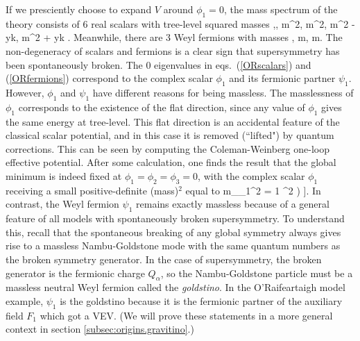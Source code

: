 If we presciently choose to expand $V$ around $\phi_1=0$, the mass
spectrum
of the theory
consists of 6 real scalars with tree-level squared masses
,\>,\>\> m^2,\>\> m^2,\>\> m^2 - yk,\>\> m^2 + yk .
\label{ORscalars}
\eeq
Meanwhile, there are 3 Weyl fermions with masses
,\>\> m,\>\> m.
\label{ORfermions}
\eeq
The non-degeneracy of scalars and fermions is a clear sign that
supersymmetry has been spontaneously broken.
The 0 eigenvalues in eqs.~(\ref{ORscalars}) and (\ref{ORfermions})
correspond to the complex scalar $\phi_1$
and its fermionic partner $\psi_1$.
However, $\phi_1$ and $\psi_1$ have different reasons
for being massless. The masslessness of $\phi_1$ corresponds to the
existence of the flat direction, since any value of
$\phi_1$ gives the same energy at tree-level.
This flat direction is an accidental feature of the classical
scalar potential, and in this case it is removed (``lifted") by quantum
corrections. This can be seen by computing the Coleman-Weinberg
one-loop effective potential.\cite{ColemanWeinberg}
After some calculation, one finds
the result that the global minimum is
indeed fixed at
$\phi_1=\phi_2=\phi_3=0$, with the complex scalar
$\phi_1$ receiving a small positive-definite (mass)$^2$ equal to
\beq
m_{\phi_1}^2 = {1 \pi^2} \left [
\Bigl ({ym^4\over k} + y^3 k \Bigr ) {\rm ln}\Bigl (
{m^2 + yk\over m^2 - yk} \Bigr ) +
2y^2  m^2 \Bigl ( {\rm ln}[1 - {y^2k^2 \over m^4}] -1\Bigr )
\right ].\>\>\>\>\>\>\>{}
\eeq
[In the limit $yk\ll m^2$, this reduces to $m_{\phi_1}^2 = y^4 k^2/(48
\pi^2
m^2)$.]
In contrast, the Weyl fermion $\psi_1$ remains exactly massless
because of a general feature
of all models with spontaneously broken supersymmetry. To understand
this, recall that the
spontaneous breaking of any global symmetry always gives rise
to a massless Nambu-Goldstone mode with the same quantum numbers as the
broken symmetry generator. In the case of supersymmetry, the broken
generator is the fermionic charge $Q_\alpha$, so the
Nambu-Goldstone particle must be a massless neutral Weyl fermion called the
{\it goldstino}. In the O'Rai\-f\-ear\-taigh model example, $\psi_1$ is the
goldstino because it is the fermionic partner of the auxiliary field
$F_1$ which got a VEV. (We will prove these statements in  
a more general context in section \ref{subsec:origins.gravitino}.)

